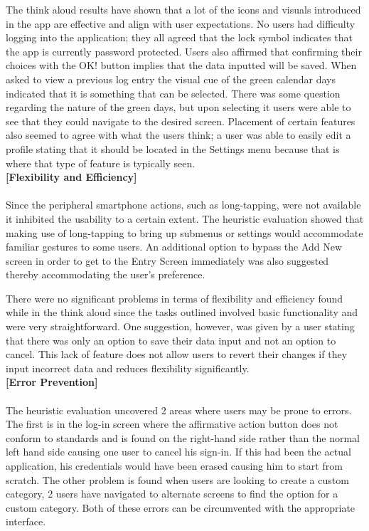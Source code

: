 \documentclass[pdftex,12pt,a4paper]{report}
\begin{document}
The think aloud results have shown that a lot of the icons and visuals introduced in the app are effective and align with user expectations. No users had difficulty logging into the application; they all agreed that the lock symbol indicates that the app is currently password protected. Users also affirmed that confirming their choices with the OK! button implies that the data inputted will be saved. When asked to view a previous log entry the visual cue of the green calendar days indicated that it is something that can be selected. There was some question regarding the nature of the green days, but upon selecting it users were able to see that they could navigate to the desired screen. Placement of certain features also seemed to agree with what the users think; a user was able to easily edit a profile stating that it should be located in the Settings menu because that is where that type of feature is typically seen.\\

\noindent\textbf{[Flexibility and Efficiency]}\\\\
Since the peripheral smartphone actions, such as long-tapping, were not available it inhibited the usability to a certain extent. The heuristic evaluation showed that making use of long-tapping to bring up submenus or settings would accommodate familiar gestures to some users. An additional option to bypass the Add New screen in order to get to the Entry Screen immediately was also suggested thereby accommodating the user's preference.

There were no significant problems in terms of flexibility and efficiency found while in the think aloud since the tasks outlined involved basic functionality and were very straightforward. One suggestion, however, was given by a user stating that there was only an option to save their data input and not an option to cancel. This lack of feature does not allow users to revert their changes if they input incorrect data and reduces flexibility significantly.\\

\noindent\textbf{[Error Prevention]}\\\\
The heuristic evaluation uncovered 2 areas where users may be prone to errors. The first is in the log-in screen where the affirmative action button does not conform to standards and is found on the right-hand side rather than the normal left hand side causing one user to cancel his sign-in. If this had been the actual application, his credentials would have been erased causing him to start from scratch. The other problem is found when users are looking to create a custom category, 2 users have navigated to alternate screens to find the option for a custom category. Both of these errors can be circumvented with the appropriate interface.\\
\end{document}
